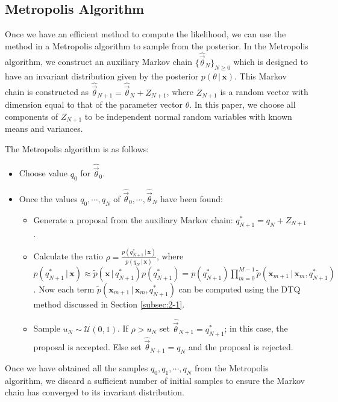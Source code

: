 \documentclass[graybox]{svmult}
\begin{document}
\subsection{Metropolis Algorithm}
\label{subsec:2-2}
Once we have an efficient method to compute the likelihood, we can use the method in a Metropolis algorithm to sample from the posterior. In the Metropolis algorithm, we construct an auxiliary  Markov chain $\lbrace \hat{\vec{\theta}}_N\rbrace_{N\geq 0}$ which is designed to have an invariant distribution given by the posterior $p(\theta \, | \, \mathbf{x})$. This Markov chain is constructed as $\hat{\vec{\theta}}_{N+1} = \hat{\vec{\theta}}_N + Z_{N+1}$,
where $Z_{N+1}$ is a random vector with dimension equal to that of the parameter vector $\theta$.  In this paper, we choose all components of $Z_{N+1}$ to be independent normal random variables with known means and variances.

The Metropolis algorithm is as follows:
\begin{itemize}
\item Choose value $q_0$ for $\hat{\vec{\theta}}_{0}$.
\item Once the values $q_0, \cdots, q_N$ of $\hat{\vec{\theta}}_{0},\cdots,\hat{\vec{\theta}}_{N}$ have been found:
\begin{itemize}
\item Generate a proposal from the auxiliary Markov chain:
$q_{N+1}^{*} = q_{N} + Z_{N+1}$.
\item Calculate the ratio $\rho = \frac{p(q_{N+1}^{*}  \, | \, \mathbf{x})}{p(q_N \, | \, \mathbf{x})}$, where $p(q_{N+1}^{*}  \, | \, \mathbf{x}) \approx \widetilde{p}(\mathbf{x} \, | \, q_{N+1}^{*}) p(q_{N+1}^{*}) = p(q_{N+1}^{*}) \prod_{m=0}^{M-1} \widetilde{p}(\mathbf{x}_{m+1} \, | \, \mathbf{x}_m, q_{N+1}^{*})$. Now each term $\widetilde{p}(\mathbf{x}_{m+1} \, | \, \mathbf{x}_m, q_{N+1}^{*})$ can be computed using the DTQ method
discussed in Section \ref{subsec:2-1}.
\item Sample $u_N \sim \mathcal{U}(0,1)$.  If $\rho > u_N$ set $\hat{\vec{\theta}}_{N+1} = q_{N+1}^{*}$; in this case, the proposal is accepted. Else set $\hat{\vec{\theta}}_{N+1} = q_{N}$ and the proposal is rejected.
\end{itemize}
\end{itemize}
Once we have obtained all the samples $q_0, q_1, \cdots, q_N$ from the Metropolis algorithm, we discard a sufficient number of initial samples to ensure the Markov chain has converged to its invariant distribution.
\end{document}
